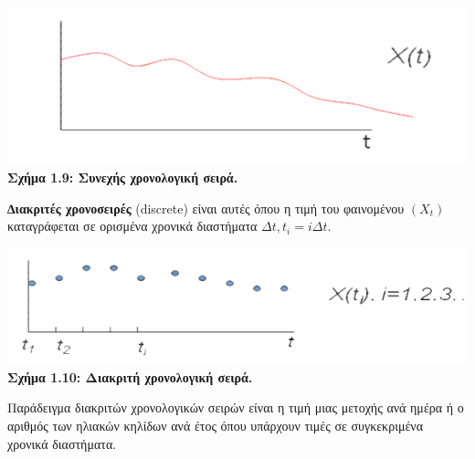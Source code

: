 \begin{center}
\includegraphics[scale=0.6]{graf6_1.png}
\textbf{Σχήμα 1.9: Συνεχής χρονολογική σειρά.}
\end{center}
\textbf{∆ιακριτές  χρονοσειρές} (discrete) είναι αυτές όπου η τιμή του
φαινομένου $ \left(X_t\right)$
καταγράφεται σε ορισμένα χρονικά διαστήματα $
\Delta t, t_i=i\Delta t.$

\begin{center}
\includegraphics[scale=0.6]{graf6_2.png}
\textbf{Σχήμα 1.10: Διακριτή χρονολογική σειρά.}
\end{center}

Παράδειγμα διακριτών χρονολογικών σειρών είναι η τιμή μιας μετοχής ανά
ημέρα ή ο αριθμός των ηλιακών κηλίδων ανά έτος όπου υπάρχουν τιμές σε
συγκεκριμένα χρονικά διαστήματα.\\

